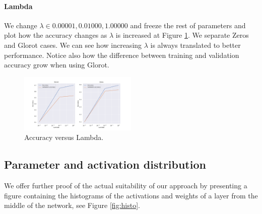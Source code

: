 \paragraph{Lambda} We change $\lambda \in {0.00001,0.01000,1.00000}$ and freeze the rest of parameters and plot how the accuracy changes as $\lambda$ is increased at Figure \ref{fig:lambdas}. We separate Zeros and Glorot cases. We can see how increasing $\lambda$ is always translated to better performance. Notice also how the difference between training and validation accuracy grow when using Glorot.

\begin{figure}[h]\label{fig:lambdas}
  \caption{Accuracy versus Lambda.}
  \centering
    \includegraphics[width=0.5\textwidth]{lambdas}
\end{figure}

\subsection{Parameter and activation distribution}

We offer further proof of the actual suitability of our approach by presenting a figure containing the histograms of the activations and weights of a layer from the middle of the network, see Figure \ref{fig:histo}.
